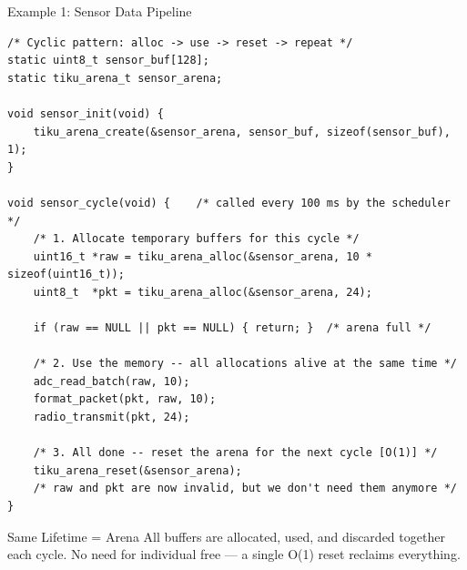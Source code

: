 \documentclass[aspectratio=169, 10pt]{beamer}
\begin{document}
\begin{frame}[fragile]{Example 1: Sensor Data Pipeline}
\begin{lstlisting}[style=cstyle]
/* Cyclic pattern: alloc -> use -> reset -> repeat */
static uint8_t sensor_buf[128];
static tiku_arena_t sensor_arena;

void sensor_init(void) {
    tiku_arena_create(&sensor_arena, sensor_buf, sizeof(sensor_buf), 1);
}

void sensor_cycle(void) {    /* called every 100 ms by the scheduler */
    /* 1. Allocate temporary buffers for this cycle */
    uint16_t *raw = tiku_arena_alloc(&sensor_arena, 10 * sizeof(uint16_t));
    uint8_t  *pkt = tiku_arena_alloc(&sensor_arena, 24);

    if (raw == NULL || pkt == NULL) { return; }  /* arena full */

    /* 2. Use the memory -- all allocations alive at the same time */
    adc_read_batch(raw, 10);
    format_packet(pkt, raw, 10);
    radio_transmit(pkt, 24);

    /* 3. All done -- reset the arena for the next cycle [O(1)] */
    tiku_arena_reset(&sensor_arena);
    /* raw and pkt are now invalid, but we don't need them anymore */
}
\end{lstlisting}

\begin{block}{Same Lifetime = Arena}
All buffers are allocated, used, and discarded together each cycle.
No need for individual free --- a single O(1) reset reclaims everything.
\end{block}
\end{frame}
\end{document}
